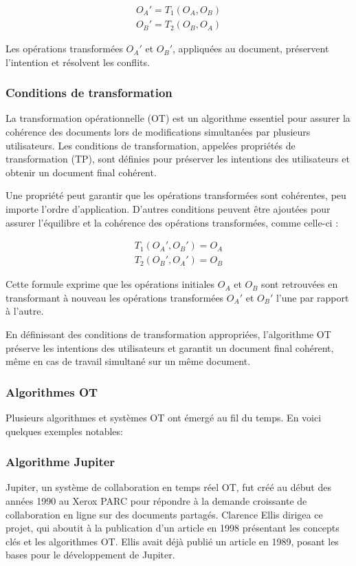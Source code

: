 \begin{equation}
    \begin{aligned}
        O_A' = T_1(O_A, O_B) \\
        O_B' = T_2(O_B, O_A)
    \end{aligned}
\end{equation}

Les opérations transformées $O_A'$ et $O_B'$, appliquées au document, préservent l'intention et résolvent les conflits.

\subsubsection{Conditions de transformation}
La transformation opérationnelle (OT) est un algorithme essentiel pour assurer la cohérence des documents lors de modifications simultanées par plusieurs utilisateurs. Les conditions de transformation, appelées propriétés de transformation (TP), sont définies pour préserver les intentions des utilisateurs et obtenir un document final cohérent.

Une propriété peut garantir que les opérations transformées sont cohérentes, peu importe l'ordre d'application. D'autres conditions peuvent être ajoutées pour assurer l'équilibre et la cohérence des opérations transformées, comme celle-ci :

\begin{equation}
    \begin{aligned}
        T_1(O_A', O_B') = O_A \\
        T_2(O_B', O_A') = O_B
    \end{aligned}
\end{equation}

Cette formule exprime que les opérations initiales $O_A$ et $O_B$ sont retrouvées en transformant à nouveau les opérations transformées $O_A'$ et $O_B'$ l'une par rapport à l'autre.

En définissant des conditions de transformation appropriées, l'algorithme OT préserve les intentions des utilisateurs et garantit un document final cohérent, même en cas de travail simultané sur un même document.
\subsubsection{Algorithmes OT}
Plusieurs algorithmes et systèmes OT ont émergé au fil du temps. En voici quelques exemples notables:

\subsubsection{Algorithme Jupiter}
Jupiter, un système de collaboration en temps réel OT, fut créé au début des années 1990 au Xerox PARC pour répondre à la demande croissante de collaboration en ligne sur des documents partagés. Clarence Ellis dirigea ce projet, qui aboutit à la publication d'un article\cite{sunOperationalTransformationRealTime1998} en 1998 présentant les concepts clés et les algorithmes OT. Ellis avait déjà publié un article\cite{ellisConcurrencyControlGroupware1989} en 1989, posant les bases pour le développement de Jupiter.

